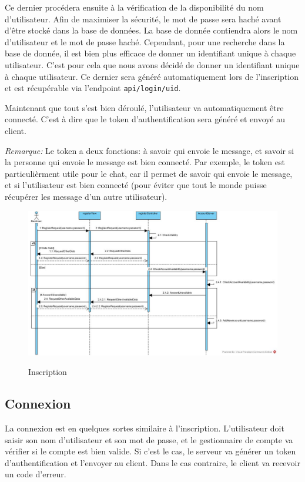\documentclass[../design_fonctionnement_sys.tex]{subfiles}
\begin{document}
Ce dernier procédera ensuite à la vérification de la disponibilité du nom d'utilisateur. Afin de maximiser la sécurité, le mot de passe sera haché avant d'être stocké dans la base de données.
La base de donnée contiendra alors le nom d'utilisateur et le mot de passe haché. Cependant, pour une recherche dans la base de donnée, 
il est  bien plus efficace de donner un identifiant unique à chaque utilisateur. C'est pour cela que nous avons décidé de donner un identifiant unique à chaque utilisateur.
Ce dernier sera généré automatiquement lors de l'inscription et est récupérable via l'endpoint \texttt{api/login/uid}.

Maintenant que tout s'est bien déroulé, l'utilisateur va automatiquement être connecté. C'est à dire que le token d'authentification sera généré et envoyé au client.

\textit{Remarque:} Le token a deux fonctions: à savoir qui envoie le message, et savoir si la personne qui envoie le message est bien connecté.
Par exemple, le token est particulièrment utile pour le chat, car il permet de savoir qui envoie le message, et si l'utilisateur est bien connecté (pour éviter que tout le monde puisse récupérer les message d'un autre utilisateur).

\begin{figure}[H]
    \centering
    \includegraphics[scale=0.4]{img_design/RegisterSD.jpg}
    \label{fig:seq_match_client}
    \caption{Inscription}
\end{figure}
\newpage

\subsection{Connexion}
La connexion est en quelques sortes similaire à l'inscription. L'utilisateur doit saisir son nom d'utilisateur et son mot de passe, et le gestionnaire de compte va vérifier
si le compte est bien valide. Si c'est le cas, le serveur va générer un token d'authentification et l'envoyer au client. Dans le cas contraire,
le client va recevoir un code d'erreur.
\end{document}
